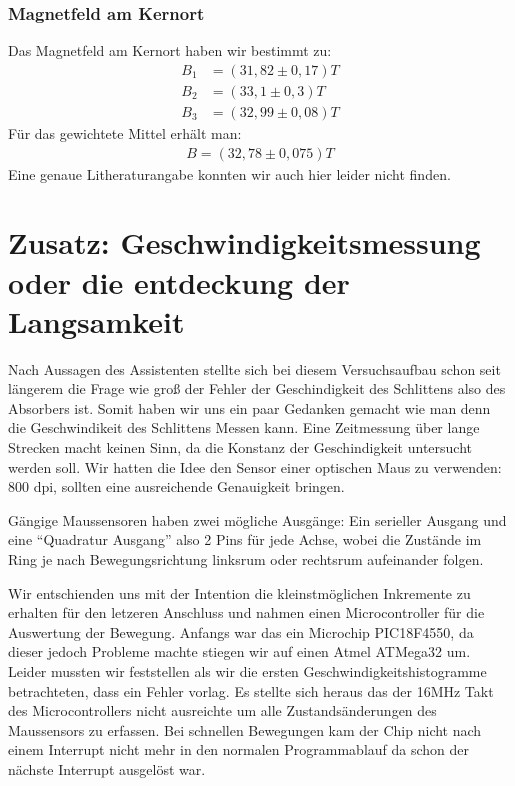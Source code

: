 \documentclass[12pt]{article}
\begin{document}
\subsubsection*{Magnetfeld am Kernort}
Das Magnetfeld am Kernort haben wir bestimmt zu:
\begin{align*}
  B_1 &= (31,82\pm0,17)T \\
 B_2 &= (33,1\pm0,3)T \\
 B_3 &= (32,99\pm0,08)T
\end{align*}
Für das gewichtete Mittel erhält man:
\begin{align*}
 B = (32,78 \pm 0,075)T
\end{align*}
Eine genaue Litheraturangabe konnten wir auch hier leider nicht finden.


\section{Zusatz: Geschwindigkeitsmessung oder die entdeckung der Langsamkeit}
Nach Aussagen des Assistenten stellte sich bei diesem Versuchsaufbau schon seit längerem die Frage wie groß der Fehler der Geschindigkeit des Schlittens also des Absorbers ist. Somit haben wir uns ein paar Gedanken gemacht wie man denn die Geschwindikeit des Schlittens Messen kann. Eine Zeitmessung über lange Strecken macht keinen Sinn, da die Konstanz der Geschindigkeit untersucht werden soll. Wir hatten die Idee den Sensor einer optischen Maus zu verwenden: 800 dpi, sollten eine ausreichende Genauigkeit bringen.

Gängige Maussensoren haben zwei mögliche Ausgänge: Ein serieller Ausgang und eine ``Quadratur Ausgang'' also 2 Pins für jede Achse, wobei die Zustände im Ring je nach Bewegungsrichtung linksrum oder rechtsrum aufeinander folgen.

Wir entschienden uns mit der Intention die kleinstmöglichen Inkremente zu erhalten für den letzeren Anschluss und nahmen einen Microcontroller für die Auswertung der Bewegung. Anfangs war das ein Microchip PIC18F4550, da dieser jedoch Probleme machte stiegen wir auf einen Atmel ATMega32 um. Leider mussten wir feststellen als wir die ersten Geschwindigkeitshistogramme betrachteten, dass ein Fehler vorlag. Es stellte sich heraus das der 16MHz Takt des Microcontrollers nicht ausreichte um alle Zustandsänderungen des Maussensors zu erfassen. Bei schnellen Bewegungen kam der Chip nicht nach einem Interrupt nicht mehr in den normalen Programmablauf da schon der nächste Interrupt ausgelöst war.
\end{document}
